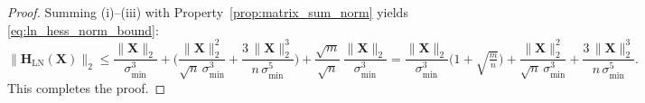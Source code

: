 \documentclass{article}
\begin{document}
\begin{proof}
Summing (i)–(iii) with Property~\ref{prop:matrix_sum_norm} yields \eqref{eq:ln_hess_norm_bound}:
\[
\|\mathbf{H}_{\mathrm{LN}}(\mathbf{X})\|_2
\le \frac{\|\mathbf{X}\|_2}{\sigma_{\min}^3}
+ \Big(\frac{\|\mathbf{X}\|_2^2}{\sqrt{n}\,\sigma_{\min}^3}
+ \frac{3\,\|\mathbf{X}\|_2^3}{n\,\sigma_{\min}^5}\Big)
+ \frac{\sqrt{m}}{\sqrt{n}}\,\frac{\|\mathbf{X}\|_2}{\sigma_{\min}^3}
=
\frac{\|\mathbf{X}\|_2}{\sigma_{\min}^3}\Big(1+\sqrt{\tfrac{m}{n}}\Big)
+ \frac{\|\mathbf{X}\|_2^2}{\sqrt{n}\,\sigma_{\min}^3}
+ \frac{3\,\|\mathbf{X}\|_2^3}{n\,\sigma_{\min}^5}.
\]
This completes the proof.
\end{proof}
\end{document}
